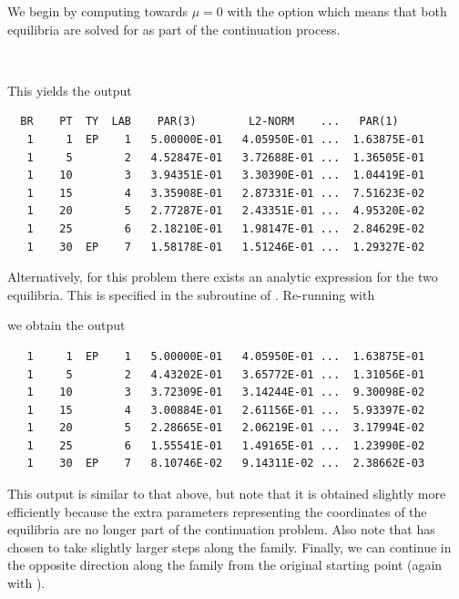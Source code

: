 \documentclass[12pt]{report}
\begin{document}
We begin by computing towards $\mu=0$ with the option 
which means that both equilibria are solved for as part of
the continuation process.
\begin{center}
 \\
\end{center} 
This yields the output
\begin{verbatim}
  BR    PT  TY  LAB    PAR(3)        L2-NORM    ...   PAR(1)     
   1     1  EP    1   5.00000E-01   4.05950E-01 ...  1.63875E-01
   1     5        2   4.52847E-01   3.72688E-01 ...  1.36505E-01
   1    10        3   3.94351E-01   3.30390E-01 ...  1.04419E-01
   1    15        4   3.35908E-01   2.87331E-01 ...  7.51623E-02
   1    20        5   2.77287E-01   2.43351E-01 ...  4.95320E-02
   1    25        6   2.18210E-01   1.98147E-01 ...  2.84629E-02
   1    30  EP    7   1.58178E-01   1.51246E-01 ...  1.29327E-02
\end{verbatim}
Alternatively, for this problem there exists an analytic expression for
the two equilibria. This is specified in the subroutine  of
. Re-running with 
\begin{center}
\end{center}
we obtain the output
\begin{verbatim}
   1     1  EP    1   5.00000E-01   4.05950E-01 ...  1.63875E-01
   1     5        2   4.43202E-01   3.65772E-01 ...  1.31056E-01
   1    10        3   3.72309E-01   3.14244E-01 ...  9.30098E-02
   1    15        4   3.00884E-01   2.61156E-01 ...  5.93397E-02
   1    20        5   2.28665E-01   2.06219E-01 ...  3.17994E-02
   1    25        6   1.55541E-01   1.49165E-01 ...  1.23990E-02
   1    30  EP    7   8.10746E-02   9.14311E-02 ...  2.38662E-03
\end{verbatim}
This output is similar to that above, but note that it is obtained slightly
more efficiently because the extra parameters  representing the
coordinates of the equilibria are no longer
part of the continuation problem. Also note that \AUTO has chosen to take
slightly larger steps along the family. Finally, we can continue in the opposite
direction along the family from the original starting point (again with ).
\begin{center}
\\
\end{center}
\end{document}
